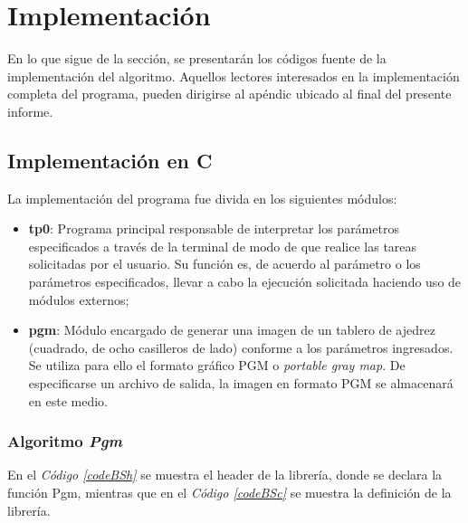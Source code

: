 \documentclass{article}
\newcommand{\refcode}[1]{\textit{Código \ref{#1}}}
\begin{document}
\section{Implementación}
	
	En lo que sigue de la sección, se presentarán los códigos fuente de la implementación del algoritmo. Aquellos lectores interesados en la implementación completa del programa, pueden dirigirse al apéndic ubicado al final del presente informe.



\subsection{Implementación en C}

	La implementación del programa fue divida en los siguientes módulos:
	\medskip

\begin{itemize}

\itemsep=2pt \topsep=0pt \partopsep=0pt \parskip=0pt \parsep=0pt
	\item \textbf{tp0}: Programa principal responsable de interpretar los parámetros especificados a través de la terminal de modo de que realice las tareas solicitadas por el usuario. Su función es, de acuerdo al parámetro o los parámetros especificados, llevar a cabo la ejecución solicitada haciendo uso de módulos externos;
	\item \textbf{pgm}: Módulo encargado de generar una imagen de un tablero de ajedrez (cuadrado, de ocho casilleros de lado) conforme a los parámetros ingresados. Se utiliza para ello el formato gráfico PGM o \textit{portable gray map}. De especificarse un archivo de salida, la imagen en formato PGM se almacenará en este medio.

\end{itemize}	
\medskip


\subsubsection{Algoritmo \textit{Pgm}}

	En el \refcode{codeBSh} se muestra el header de la librería, donde se declara la función Pgm, mientras que en el \refcode{codeBSc} se muestra la definición de la librería.

\lstset{ language = C } %
 
\bigskip
\end{document}
